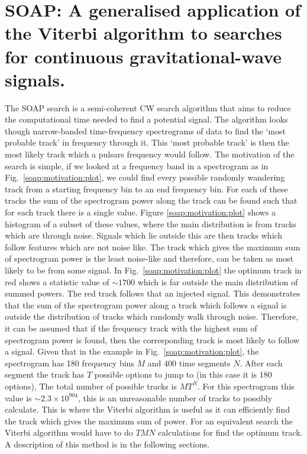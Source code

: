 \chapter[SOAP for CW searches.]{\label{soap} SOAP: A generalised application of the Viterbi algorithm to searches for continuous gravitational-wave signals.}

The SOAP search is a semi-coherent \gls{CW} search algorithm that aims to
reduce the computational time needed to find a potential signal.  The algorithm
looks though narrow-banded time-frequency spectrograms of data to find the
`most probable track' in frequency through it.  This `most probable track' is
then the most likely track which a pulsars frequency would follow.  The
motivation of the search is simple, if we looked at a frequency band in a
spectrogram as in Fig.~\ref{soap:motivation:plot}, we could find every possible
randomly wandering track from a starting frequency bin to an end frequency bin.
For each of these tracks the sum of the spectrogram power along the track can
be found such that for each track there is a single value.
Figure \ref{soap:motivation:plot} shows a histogram of a subset of these values, where the main distribution is from tracks which are through noise.
Signals which lie outside this are then tracks which follow features which are not noise like.
The track which gives the maximum sum of spectrogram power is the least noise-like and therefore, can be taken as most likely to be from some signal.
In Fig.~\ref{soap:motivation:plot} the optimum track in red shows a
statistic value of $\sim 1700$ which is far outside the main distribution of
summed powers.  The red track follows that  an injected signal.  This
demonstrates that the sum of the spectrogram power along a track which follows
a signal is outside the distribution of tracks which randomly walk through noise.
Therefore, it can be assumed that if the frequency track with the highest sum
of spectrogram power is found, then the corresponding track is most likely
to follow a signal.  Given that in the example in Fig.~\ref{soap:motivation:plot}, the
spectrogram has 180 frequency bins $M$ and 400 time segments $N$.
After each segment the track has $T$ possible options to jump to (in this case
it is 180 options), The total number of possible tracks is $MT^{N}$.
For this spectrogram this value is $\sim 2.3 \times 10^{904}$, this is an unreasonable
number of tracks to possibly calculate. This is where the Viterbi algorithm
\citep{viterbi1967ErrorBounds} is useful as it can efficiently find the track
which gives the maximum sum of power. For an equivalent search the Viterbi
algorithm would have to do $TMN$ calculations for find the optimum track. A description of this method is in the following sections.

